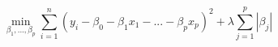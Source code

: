 $$\min_{\beta_1,...,\beta_p}\sum_{i=1}^n(y_i-\beta_0-\beta_1x_1-...-\beta_px_p)^2+\lambda \sum_{j=1}^p|\beta_j|$$